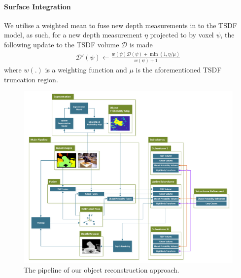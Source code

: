 \paragraph{Surface Integration}
We utilise a weighted mean to fuse new depth measurements in to the TSDF model, as such, for a new depth measurement $\eta$ projected to by voxel $\psi$, 
the following update to the TSDF volume $\mathcal{D}$ is made
\begin{equation}
	\begin{split}
		\mathcal{D}'(\psi) \leftarrow \frac{w(\psi)\mathcal{D}(\psi) + \min(1, \eta/\mu)}{w(\psi) + 1}
	\end{split}
\end{equation}
where $w(.)$ is a weighting function and $\mu$ is the aforementioned TSDF truncation region.
\begin{figure}[!t]
	\centering
	\includegraphics[width=0.7\linewidth]{pipeline.pdf}
	\vspace{-3mm}
	\caption{The pipeline of our object reconstruction approach.}
	\label{pipelineDiagram}
\end{figure}

